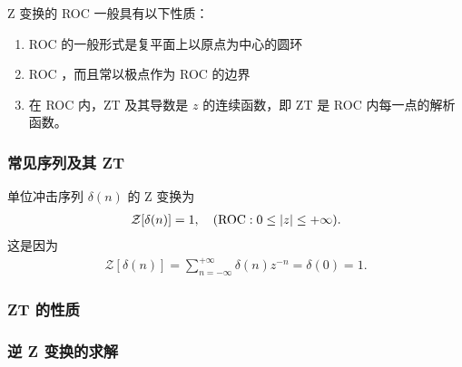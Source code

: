 \begin{property}
    Z 变换的 ROC 一般具有以下性质：
    \begin{enumerate}
        \item ROC 的一般形式是复平面上以原点为中心的圆环
        \item ROC ，而且常以极点作为 ROC 的边界
        \item 在 ROC 内，ZT 及其导数是 $z$ 的连续函数，即 ZT 是 ROC 内每一点的解析函数。
    \end{enumerate}
\end{property}



\subsubsection{常见序列及其 ZT}

\begin{example}[单位冲激序列的 ZT]
    单位冲击序列 $\delta(n)$ 的 Z 变换为
    \begin{align*}
        \mathcal{Z}[\delta(n)] = 1, \quad (\text{ROC}: 0 \le \left|z\right| \le +\infty).
    \end{align*}
    这是因为
    \begin{align*}
        \mathcal{Z}[\delta(n)] = \sum_{n=-\infty}^{+\infty} \delta(n) z^{-n} = \delta(0) = 1.
    \end{align*}
\end{example}

\subsubsection{ZT 的性质}

\subsubsection{逆 Z 变换的求解}
